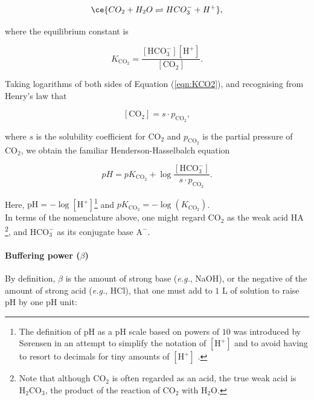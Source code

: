 \documentclass[fleqn,10pt]{physiome}
\begin{document}
\begin{equation*}
\ce{CO_2 + H_2O \rightleftharpoons HCO_3^- + H^+},
\end{equation*}

where the equilibrium constant is

\begin{equation}
K_\mathrm{CO_2}=\dfrac{\mathrm{[HCO_3^-][H^+]}}{\mathrm{[CO_2]}}.
\label{eqn:KCO2}
\end{equation}

Taking logarithms of both sides of Equation (\ref{eqn:KCO2}), and recognising from Henry's law that

\begin{equation}
\mathrm{[CO_2]}=s\cdot p_\mathrm{CO_2},
\end{equation}

where $s$ is the solubility coefficient for $\mathrm{CO_2}$ and $p_\mathrm{CO_2}$ is the partial pressure of $\mathrm{CO_2}$, we obtain the familiar Henderson-Hasselbalch equation

\begin{equation}
pH=pK_\mathrm{CO_2}+\log{\dfrac{\mathrm{[HCO_3^-]}}{s\cdot p_\mathrm{CO_2}}}.
\end{equation}

Here, $\mathrm{pH}=-\log\mathrm{[H^+]}$\footnote{The definition of $\mathrm{pH}$ as a $\mathrm{pH}$ scale based on powers of $10$ was introduced by S{\o}rensen in an attempt to simplify the notation of $\mathrm{[H^+]}$ and to avoid having to resort to decimals for tiny amounts of $\mathrm{[H^+]}$ \citep{sorensen2007messung}.} and $pK_\mathrm{CO_2}=-\log(K_\mathrm{CO_2})$.\\

In terms of the nomenclature above, one might regard $\mathrm{CO_2}$ as the weak acid HA \footnote{Note that although $\mathrm{CO_2}$ is often regarded as an acid, the true weak acid is $\mathrm{H_2CO_3}$, the product of the reaction of $\mathrm{CO_2}$ with $\mathrm{H_2O}$.}, and $\mathrm{HCO_3^-}$ as its conjugate base $\mathrm{A^-}$.


\paragraph{Buffering power ($\beta$)}
By definition, $\beta$ is the amount of strong base (\emph{e.g.}, NaOH), or the negative of the amount of strong acid (\emph{e.g.}, HCl), that one must add to $1$ $\mathrm{L}$ of solution to raise $\mathrm{pH}$ by one $\mathrm{pH}$ unit:
\end{document}
